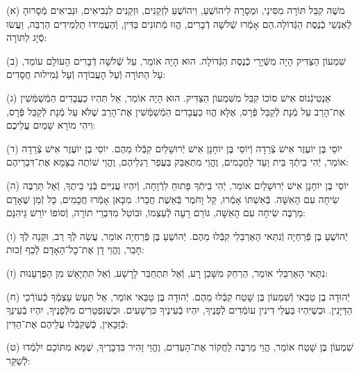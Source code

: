 \documentclass[twoside, openany, parskip=half, 11pt]{book}
\begin{document}
\kolyisroel

(א) משֶׁה קִבֵּל תּוֹרָה מִסִּינַי, וּמְסָרָהּ לִיהוֹשֻׁעַ, וִיהוֹשֻׁעַ לִזְקֵנִים, וּזְקֵנִים לִנְבִיאִים, וּנְבִיאִים מְֿסָרוּהָ לְֿאַנְשֵׁי כְֿנֶסֶת הַגְּֿדוֹלָה.הֵם אָמְֿרוּ שְֿׁלשָׁה דְֿבָרִים, הֱווּ מְֿתוּנִים בַּדִּין, וְֿהַעֲמִידוּ תַלְמִידִים הַרְבֵּה, וַעֲשׂוּ סְֿיָג לַתּוֹרָה:



(ב) שִׁמְעוֹן הַצַּדִּיק הָיָה מִשְּֿׁיָרֵי כְֿנֶסֶת הַגְּֿדוֹלָה. הוּא הָיָה אוֹמֵר, עַל שְֿׁלשָׁה דְֿבָרִים הָעוֹלָם עוֹמֵד, עַל הַתּוֹרָה וְֿעַל הָעֲבוֹדָה וְֿעַל גְּֿמִילוּת חֲסָדִים:

(ג) אַנְטִיגְֿנוֹס אִישׁ סוֹכוֹ קִבֵּל מִשִּׁמְעוֹן הַצַּדִּיק. הוּא הָיָה אוֹמֵר, אַל תִּהְיוּ כַעֲבָדִים הַמְֿשַׁמְּֿשִׁין אֶת־הָרַב עַל מְֿנָת לְֿקַבֵּל פְּֿרָס, אֶלָּא הֱווּ כַעֲבָדִים הַמְֿשַׁמְּֿשִׁין אֶת־הָרַב שֶׁלֹּא עַל מְֿנָת לְֿקַבֵּל פְּֿרָס, וִיהִי מוֹרָא שָׁמַיִם עֲלֵיכֶם:

(ד) יוֹסֵי בֶּן יוֹעֶזֶר אִישׁ צְֿרֵדָה וְֿיוֹסֵי בֶּן יוֹחָנָן אִישׁ יְֿרוּשָׁלַיִם קִבְּֿלוּ מֵהֶם. יוֹסֵי בֶן יוֹעֶזֶר אִישׁ צְֿרֵדָה אוֹמֵר, יְֿהִי בֵיתְֿךָ בֵּית וַעַד לַחֲכָמִים, וֶהֱוֵי מִתְאַבֵּק בַּעֲפַר רַגְלֵיהֶם, וֶהֱוֵי שׁוֹתֶה בַצָּמָא אֶת־דִּבְרֵיהֶם:

(ה) יוֹסֵי בֶּן יוֹחָנָן אִישׁ יְֿרוּשָׁלַיִם אוֹמֵר, יְֿהִי בֵיתְֿךָ פָּתוּחַ לִרְֿוָחָה, וְֿיִהְיוּ עֲנִיִּים בְּֿנֵי בֵיתֶךָ, וְֿאַל תַּרְבֶּה שִׂיחָה עִם הָאִשָּׁה. בְּֿאִשְׁתּוֹ אָמְֿרוּ, קַל וָחֹמֶר בְּֿאֵשֶׁת חֲבֵרוֹ. מִכָּאן אָמְֿרוּ חֲכָמִים, כָּל זְֿמַן שֶׁאָדָם מַרְבֶּה שִׂיחָה עִם הָאִשָּׁה, גּוֹרֵם רָעָה לְֿעַצְמוֹ, וּבוֹטֵל מִדִּבְרֵי תוֹרָה, וְֿסוֹפוֹ יוֹרֵשׁ גֵּיהִנָּם:

(ו) יְֿהוֹשֻׁעַ בֶּן פְּֿרַחְיָה וְֿנִתַּאי הָאַרְבֵּלִי קִבְּֿלוּ מֵהֶם. יְֿהוֹשֻׁעַ בֶּן פְּֿרַחְיָה אוֹמֵר, עֲשֵׂה לְֿךָ רַב, וּקְנֵה לְֿךָ חָבֵר, וֶהֱוֵי דָן אֶת־כׇל־הָאָדָם לְֿכַף זְֿכוּת:

(ז) נִתַּאי הָאַרְבֵּלִי אוֹמֵר, הַרְחֵק מִשָּׁכֵן רָע, וְֿאַל תִּתְחַבֵּר לָרָשָׁע, וְֿאַל תִּתְיָאֵשׁ מִן הַפֻּרְעָנוּת:

(ח) יְֿהוּדָה בֶן טַבַּאי וְֿשִׁמְעוֹן בֶּן שָׁטַח קִבְּֿלוּ מֵהֶם. יְֿהוּדָה בֶּן טַבַּאי אוֹמֵר, אַל תַּעַשׂ עַצְמְֿךָ כְּֿעוֹרְֿכֵי הַדַּיָּנִין. וּכְשֶׁיִּהְיוּ בַּעֲלֵי דִינִין עוֹמְֿדִים לְֿפָנֶיךָ, יִהְיוּ בְֿעֵינֶיךָ כִּרְשָׁעִים. וּכְשֶׁנִּפְטָרִים מִלְּֿפָנֶיךָ, יִהְיוּ בְֿעֵינֶךָ כְּֿזַכָּאִין, כְּֿשֶׁקִּבְּֿלוּ עֲלֵיהֶם אֶת־הַדִּין:

(ט) שִׁמְעוֹן בֶּן שָׁטַח אוֹמֵר, הֱוֵי מַרְבֶּה לַחֲקוֹר אֶת־הָעֵדִים, וֶהֱוֵי זָהִיר בִּדְבָרֶיךָ, שֶׁמָּא מִתּוֹכָם יִלְמְֿדוּ לְֿשַׁקֵּר:
\end{document}
